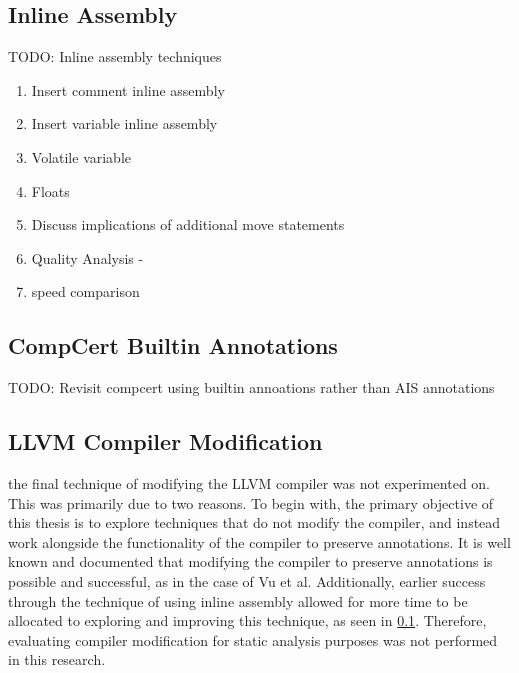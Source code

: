\subsection{Inline Assembly}
\label{subsec:inlineAssembly}
TODO: Inline assembly techniques

\begin{enumerate}
    \item Insert comment inline assembly
    \item Insert variable inline assembly
    \item Volatile variable
    \item Floats
    \item Discuss implications of additional move statements
    \item Quality Analysis -
    \item speed comparison
\end{enumerate}

\subsection{CompCert Builtin Annotations}
TODO: Revisit compcert using builtin annoations rather than AIS annotations

\subsection{LLVM Compiler Modification}
the final technique of modifying the LLVM compiler was not experimented on. This was primarily due to two reasons. To begin with, the primary objective of this thesis is to explore techniques that do not modify the compiler, and instead work alongside the functionality of the compiler to preserve annotations. It is well known and documented that modifying the compiler to preserve annotations is possible and successful, as in the case of Vu et al. \cite{vu2020secure} Additionally, earlier success through the technique of using inline assembly allowed for more time to be allocated to exploring and improving this technique, as seen in \ref{subsec:inlineAssembly}. Therefore, evaluating compiler modification for static analysis purposes was not performed in this research.

